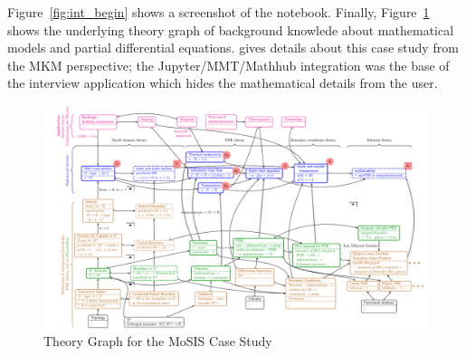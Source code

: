 Figure~\ref{fig:int_begin} shows a screenshot of the notebook.
Finally, Figure~\ref{fig:pde-theory} shows the underlying theory graph of background knowlede about mathematical models and partial differential equations. \cite{PolKohKoe:kacse18} gives details about this case study from the MKM perspective; the Jupyter/MMT/Mathhub integration was the base of the interview application which hides the mathematical details from the user.  


\begin{figure}[h!p]\centering
  \begin{turn}{-90}\includegraphics[width=0.95\textheight]{pde-theory}\end{turn}
  \caption{Theory Graph for the MoSIS Case Study}\label{fig:pde-theory}
\end{figure}


